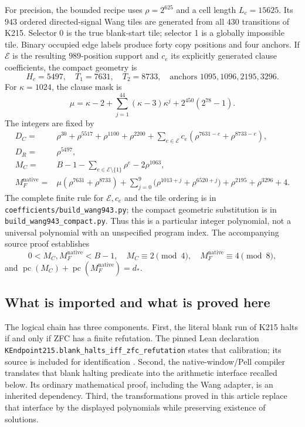 \documentclass[11pt]{article}
\theoremstyle{remark}\newtheorem{remark}[theorem]{Remark}
\newcommand{\pc}{\operatorname{pc}}\newcommand{\Norm}{\operatorname{N}}
\begin{document}
For precision, the bounded recipe uses $\rho=2^{625}$ and a cell length
$L_c=15625$. Its $943$ ordered directed-signal Wang tiles are generated from
all $430$ transitions of K215. Selector 0 is the true blank-start tile;
selector 1 is a globally impossible tile. Binary occupied edge labels produce
forty copy positions and four anchors. If $\mathcal E$ is the resulting
$989$-position support and $c_e$ its explicitly generated clause coefficients,
the compact geometry is
\[
 H_c=5497,\quad T_1=7631,\quad T_2=8733,
 \quad\text{anchors }1095,1096,2195,3296.
\]
For $\kappa=1024$, the clause mask is
\[
 \mu=\kappa-2+\sum_{j=1}^{44}(\kappa-3)\kappa^j
       +2^{450}(2^{78}-1).
\]
The integers are fixed by
\begin{align*}
 D_C={}&\rho^{30}+\rho^{5517}+\rho^{1100}+\rho^{2200}
 +\sum_{e\in\mathcal E}c_e(\rho^{7631-e}+\rho^{8733-e}),\\
 D_R={}&\rho^{5497},\\
 M_C={}&B-1-\sum_{e\in\mathcal E\setminus\{1\}}\rho^e-2\rho^{1063},\\
 M_F^{\mathrm{native}}={}&
 \mu(\rho^{7631}+\rho^{8733})
 +\sum_{j=0}^{9}\bigl(\rho^{1013+j}+\rho^{6520+j}\bigr)
 +\rho^{2195}+\rho^{3296}+4.
\end{align*}
The complete finite rule for $\mathcal E,c_e$ and the tile ordering is in
\texttt{coefficients/build\_wang943.py}; the compact geometric substitution
is in \texttt{build\_wang943\_compact.py}. Thus this is a particular
integer polynomial, not a universal polynomial with an unspecified program
index. The accompanying source proof establishes
\[
 0<M_C,M_F^{\mathrm{native}}<B-1,\quad
 M_C\equiv2\pmod4,\quad M_F^{\mathrm{native}}\equiv4\pmod8,
\]
and $\pc(M_C)+\pc(M_F^{\mathrm{native}})=d_\ast$.

\subsection{What is imported and what is proved here}

The logical chain has three components.
First, the literal blank run of K215 halts if and only if ZFC has a finite
refutation. The pinned Lean declaration
\texttt{KEndpoint215.blank\_halts\_iff\_zfc\_refutation} states that
calibration; its source is included for identification \cite{k215}.
Second, the native-window/Pell compiler translates that blank halting
predicate into the arithmetic interface recalled below. Its ordinary
mathematical proof, including the Wang adapter, is an inherited dependency.
Third, the transformations proved in this article replace that interface
by the displayed polynomials while preserving existence of solutions.
\end{document}
